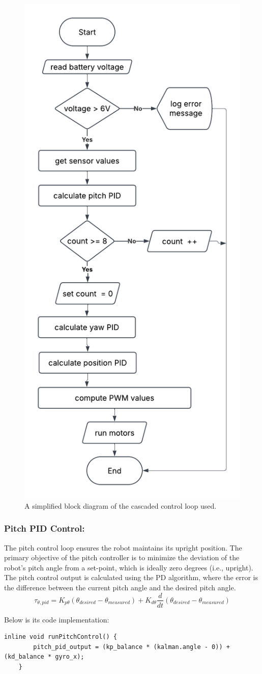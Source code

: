 \begin{figure}[H]
	\centering
	\includegraphics[width=0.5\linewidth]{assets/control_loop_diagram.png}
	\caption{A simplified block diagram of the cascaded control loop used. }
	\label{fig:control-loop}
\end{figure}

\subsubsection{Pitch PID Control:}
The pitch control loop ensures the robot maintains its upright position. The primary objective of the pitch controller is to minimize the deviation of the robot's pitch angle from a set-point, which is ideally zero degrees (i.e., upright). The pitch control output is calculated using the PD algorithm, where the error is the difference between the current pitch angle and the desired pitch angle. 
\begin{equation}
	\tau_{\theta,pid} = K_{p\theta}({\theta_{desired} - \theta_{measured}}) + K_{d\theta}\frac{d}{dt}(\theta_{desired} - \theta_{measured})
\end{equation}

Below is its code implementation:
\begin{lstlisting}[style=cppstyle2]
	inline void runPitchControl() {
		pitch_pid_output = (kp_balance * (kalman.angle - 0)) + (kd_balance * gyro_x);
	}
\end{lstlisting}

